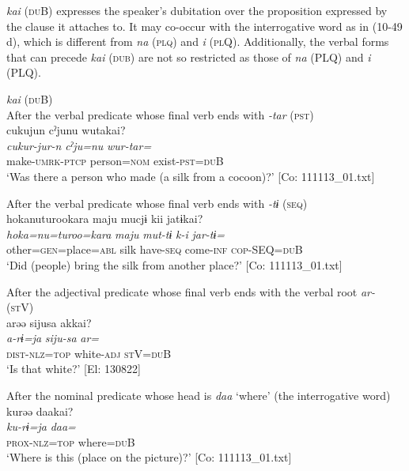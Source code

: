 \textit{kai} (\textsc{du}B) expresses the speaker’s dubitation over the proposition expressed by the clause it attaches to. It may co-occur with the interrogative word as in (10-49 d), which is different from \textit{na} (\textsc{plq}) and \textit{i} (\textsc{pl}Q). Additionally, the verbal forms that can precede \textit{kai} (\textsc{dub}) are not so restricted as those of \textit{na} (PLQ) and \textit{i} (PLQ).

\ea\label{ex:10.49}   \textit{kai} (\textsc{du}B)\\
  \ea After the verbal predicate whose final verb ends with \textit{{}-tar} (\textsc{pst})\\
      \glll    cukujun  cˀjunu  wutakai?\\
    \textit{cukur-jur-n}  \textit{cˀju=nu}  \textit{wur-tar=}\\
    make-\textsc{umrk}-\textsc{ptcp}  person=\textsc{nom}  exist-\textsc{pst}=\textsc{du}B\\
\glt     ‘Was there a person who made (a silk from a cocoon)?’  [Co: 111113\_01.txt]

  \ex After the verbal predicate whose final verb ends with \textit{{}-tɨ} (\textsc{seq})\\
      \glll    {\textbar}hoka{\textbar}nuturookara  maju  mucjɨ  kii  jatɨkai?\\
    \textit{hoka=nu=turoo=kara}  \textit{maju}  \textit{mut-tɨ}  \textit{k-i}  \textit{jar-tɨ=}\\
    other=\textsc{gen}=place=\textsc{abl}  silk  have-\textsc{seq}  come-\textsc{inf}  \textsc{cop}-SEQ=\textsc{du}B\\
\glt     ‘Did (people) bring the silk from another place?’  [Co: 111113\_01.txt]

  \ex After the adjectival predicate whose final verb ends with the verbal root \textit{ar-} (\textsc{st}V)\\
      \glll    arəə  sijusa  akkai?\\
    \textit{a-rɨ=ja}  \textit{siju-sa}  \textit{ar=}\\
    \textsc{dist}-\textsc{nlz}=\textsc{top}  white-\textsc{adj}  \textsc{st}V=\textsc{du}B\\
    \glt     ‘Is that white?’ [El: 130822]

  \ex After the nominal predicate whose head is \textit{daa} ‘where’ (the interrogative word)\\
      \glll    kurəə  daakai?\\
    \textit{ku-rɨ=ja}  \textit{daa=}\\
    \textsc{prox}-\textsc{nlz}=\textsc{top}  where=\textsc{du}B\\
\glt     ‘Where is this (place on the picture)?’  [Co: 111113\_01.txt]

